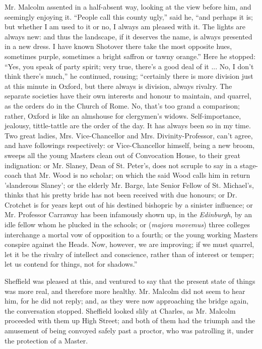 Mr. Malcolm assented in a half-absent way, looking at the view
before him, and seemingly enjoying it. ``People call this county
ugly,'' said he, ``and perhaps it is; but whether I am used to
it or no, I always am pleased with it. The lights are always new: and
thus the landscape, if it deserves the name, is always presented in a
new dress. I have known Shotover there take the most opposite hues,
sometimes purple, sometimes a bright saffron or tawny orange.''
Here he stopped: ``Yes, you speak of party spirit; very true,
there's a good deal of it ... No, I don't think there's much,'' he
continued, rousing; ``certainly there is more division just at
this minute in Oxford, but there always is division, always rivalry.
The separate societies have their own interests and honour to
maintain, and quarrel, as the orders do in the Church of Rome. No,
that's too grand a comparison; rather, Oxford is like an almshouse for
clergymen's widows. Self-importance, jealousy, tittle-tattle are the
order of the day. It has always been so in my time. Two great ladies,
Mrs. Vice-Chancellor and Mrs. Divinity-Professor, can't agree, and
have followings respectively: or Vice-Chancellor himself, being a new
broom, sweeps all the young Masters clean out of Convocation
House, to their great indignation: or Mr. Slaney, Dean of St. Peter's,
does not scruple to say in a stage-coach that Mr. Wood is no scholar;
on which the said Wood calls him in return 'slanderous Slaney'; or the
elderly Mr. Barge, late Senior Fellow of St. Michael's, thinks that
his pretty bride has not been received with due honours; or Dr.
Crotchet is for years kept out of his destined bishopric by a sinister
influence; or Mr. Professor Carraway has been infamously shown up, in
the \emph{Edinburgh}, by an idle fellow whom he plucked in the
schools; or (\emph{majora movemus}) three colleges interchange a
mortal vow of opposition to a fourth; or the young working Masters
conspire against the Heads. Now, however, we are improving; if we must
quarrel, let it be the rivalry of intellect and conscience, rather
than of interest or temper; let us contend for things, not for
shadows.''

Sheffield was pleased at this, and ventured to say that the present
state of things was more real, and therefore more healthy. Mr. Malcolm
did not seem to hear him, for he did not reply; and, as they were now
approaching the bridge again, the conversation stopped. Sheffield
looked slily at Charles, as Mr. Malcolm proceeded with them up High
Street; and both of them had the triumph and the amusement of being
convoyed safely past a proctor, who was patrolling it, under the
protection of a Master.

